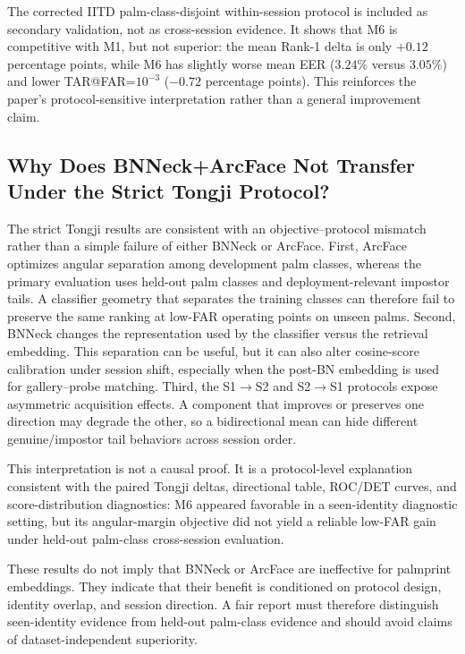 The corrected IITD palm-class-disjoint within-session protocol is included as secondary validation, not as cross-session evidence. It shows that M6 is competitive with M1, but not superior: the mean Rank-1 delta is only $+0.12$ percentage points, while M6 has slightly worse mean EER ($3.24\%$ versus $3.05\%$) and lower TAR@FAR=$10^{-3}$ ($-0.72$ percentage points). This reinforces the paper's protocol-sensitive interpretation rather than a general improvement claim.

\subsection{Why Does BNNeck+ArcFace Not Transfer Under the Strict Tongji Protocol?}

The strict Tongji results are consistent with an objective--protocol mismatch rather than a simple failure of either BNNeck or ArcFace. First, ArcFace optimizes angular separation among development palm classes, whereas the primary evaluation uses held-out palm classes and deployment-relevant impostor tails. A classifier geometry that separates the training classes can therefore fail to preserve the same ranking at low-FAR operating points on unseen palms. Second, BNNeck changes the representation used by the classifier versus the retrieval embedding. This separation can be useful, but it can also alter cosine-score calibration under session shift, especially when the post-BN embedding is used for gallery--probe matching. Third, the S1$\rightarrow$S2 and S2$\rightarrow$S1 protocols expose asymmetric acquisition effects. A component that improves or preserves one direction may degrade the other, so a bidirectional mean can hide different genuine/impostor tail behaviors across session order.

This interpretation is not a causal proof. It is a protocol-level explanation consistent with the paired Tongji deltas, directional table, ROC/DET curves, and score-distribution diagnostics: M6 appeared favorable in a seen-identity diagnostic setting, but its angular-margin objective did not yield a reliable low-FAR gain under held-out palm-class cross-session evaluation.

These results do not imply that BNNeck or ArcFace are ineffective for palmprint embeddings. They indicate that their benefit is conditioned on protocol design, identity overlap, and session direction. A fair report must therefore distinguish seen-identity evidence from held-out palm-class evidence and should avoid claims of dataset-independent superiority.

